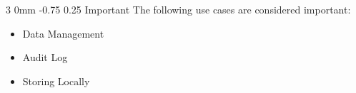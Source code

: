 \documentclass[12pt]{article}
\makeatletter
\renewcommand{\section}{\@startsection
   {section}%
   {1}%
   {0mm}%
   {-1.5\baselineskip}%
   {0.5\baselineskip}%
   {\sffamily\bfseries\upshape\normalsize}}%
\renewcommand{\subsection}{\@startsection
   {subsection}%
   {2}%
   {4mm}%
   {-0.75\baselineskip}%
   {0.25\baselineskip}%
   {\rmfamily\normalfont\scshape\normalsize}}%
\renewcommand{\subsubsection}{\@startsection
   {subsubsection}%
   {3}%
   {0mm}%
   {-0.75\baselineskip}%
   {0.25\baselineskip}%
   {\rmfamily\normalfont\slshape\normalsize}}%
\makeatother
\begin{document}
                    		\subsubsection{Important}
                    		The following use cases are considered important:
                    				\begin{itemize}
		                    				\item Data Management
		                    				\item Audit Log
		                    				\item Storing Locally
                    				\end{itemize}
                    		
                    		
             
\end{document}

